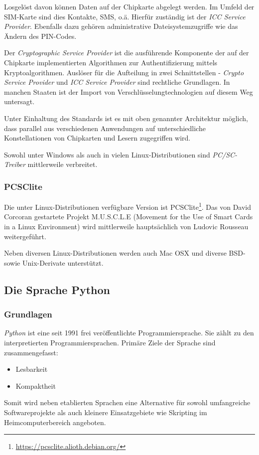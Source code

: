 Losgelöst davon können Daten auf der Chipkarte abgelegt werden. Im Umfeld
der SIM-Karte sind dies Kontakte, SMS, o.ä. Hierfür zuständig ist der
\textit{ICC Service Provider}. Ebenfalls dazu gehören administrative Dateisystemzugriffe
wie das Ändern des PIN-Codes.

Der \textit{Cryptographic Service Provider} ist die ausführende Komponente
der auf der Chipkarte implementierten Algorithmen zur Authentifizierung mittels
Kryptoalgorithmen. Auslöser für die Aufteilung in zwei Schnittstellen -
\textit{Crypto Service Provider} und \textit{ICC Service Provider} sind
rechtliche Grundlagen. In manchen Staaten ist der Import von
Verschlüsselungtechnologien auf diesem Weg untersagt.

Unter Einhaltung des Standards ist es mit oben genannter Architektur möglich,
dass parallel aus verschiedenen Anwendungen auf unterschiedliche Konstellationen
von Chipkarten und Lesern zugegriffen wird.

Sowohl unter Windows als auch in vielen Linux-Distributionen sind
\textit{PC/SC-Treiber} mittlerweile verbreitet.

\subsubsection{PCSClite}
Die unter Linux-Distributionen verfügbare Version ist
PCSClite\footnote{\url{https://pcsclite.alioth.debian.org/}}.
Das von David Corcoran gestartete Projekt M.U.S.C.L.E
(Movement for the Use of Smart Cards in a Linux Environment)
wird mittlerweile hauptsächlich von Ludovic Rousseau
weitergeführt\cite{pcscliteweb}.

Neben diversen Linux-Distributionen werden auch Mac OSX und diverse
BSD- sowie Unix-Derivate unterstützt.

\subsection{Die Sprache Python}
\subsubsection{Grundlagen}
\textit{Python} ist eine seit 1991 frei veröffentlichte Programmiersprache. Sie zählt
zu den interpretierten Programmiersprachen. Primäre Ziele der Sprache sind zusammengefasst:
\begin{itemize}
\item Lesbarkeit
\item Kompaktheit
\end{itemize}
Somit wird neben etablierten Sprachen eine Alternative für sowohl umfangreiche Softwareprojekte
als auch kleinere Einsatzgebiete wie Skripting im Heimcomputerbereich angeboten.


